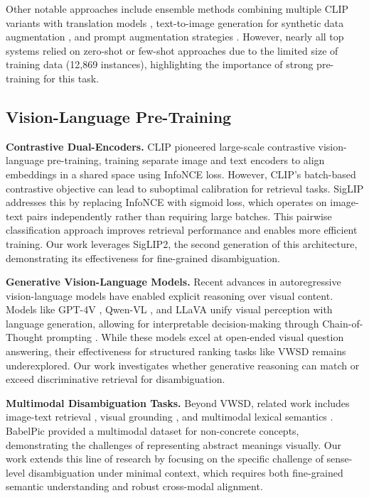\documentclass[11pt]{article}
\begin{document}
Other notable approaches include ensemble methods combining multiple CLIP variants with translation models \cite{patil2023rahul}, text-to-image generation for synthetic data augmentation \cite{li2023augmenters}, and prompt augmentation strategies \cite{ghahroodi-etal-2023-sut}. However, nearly all top systems relied on zero-shot or few-shot approaches due to the limited size of training data (12,869 instances), highlighting the importance of strong pre-training for this task.

\subsection{Vision-Language Pre-Training}

\textbf{Contrastive Dual-Encoders.} CLIP \cite{radford2021clip} pioneered large-scale contrastive vision-language pre-training, training separate image and text encoders to align embeddings in a shared space using InfoNCE loss. However, CLIP's batch-based contrastive objective can lead to suboptimal calibration for retrieval tasks. SigLIP \cite{zhai2023siglip} addresses this by replacing InfoNCE with sigmoid loss, which operates on image-text pairs independently rather than requiring large batches. This pairwise classification approach improves retrieval performance and enables more efficient training. Our work leverages SigLIP2, the second generation of this architecture, demonstrating its effectiveness for fine-grained disambiguation.

\textbf{Generative Vision-Language Models.} Recent advances in autoregressive vision-language models have enabled explicit reasoning over visual content. Models like GPT-4V \cite{openai2023gpt4v}, Qwen-VL \cite{bai2023qwen}, and LLaVA \cite{liu2023llava} unify visual perception with language generation, allowing for interpretable decision-making through Chain-of-Thought prompting \cite{wei2022chain}. While these models excel at open-ended visual question answering, their effectiveness for structured ranking tasks like VWSD remains underexplored. Our work investigates whether generative reasoning can match or exceed discriminative retrieval for disambiguation.

\textbf{Multimodal Disambiguation Tasks.} Beyond VWSD, related work includes image-text retrieval \cite{li2020oscar}, visual grounding \cite{kazemzadeh2014referit}, and multimodal lexical semantics \cite{calabrese2020evilbert}. BabelPic \cite{calabrese2020babelpic} provided a multimodal dataset for non-concrete concepts, demonstrating the challenges of representing abstract meanings visually. Our work extends this line of research by focusing on the specific challenge of sense-level disambiguation under minimal context, which requires both fine-grained semantic understanding and robust cross-modal alignment.
\end{document}
